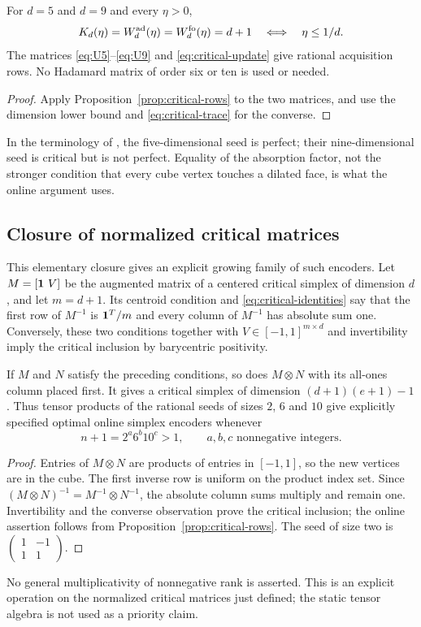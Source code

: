 \begin{corollary}
\label{cor:nonhadamard}
For $d=5$ and $d=9$ and every $\eta>0$,
\[
 K_d(\eta)=W_d^{\rm ad}(\eta)=W_d^{\rm fo}(\eta)=d+1
                  \quad\Longleftrightarrow\quad\eta\le1/d.
\]
The matrices \eqref{eq:U5}--\eqref{eq:U9} and
\eqref{eq:critical-update} give rational acquisition rows. No Hadamard
matrix of order six or ten is used or needed.
\end{corollary}
\begin{proof}
Apply Proposition~\ref{prop:critical-rows} to the two matrices, and use
the dimension lower bound and \eqref{eq:critical-trace} for the converse.
\end{proof}
In the terminology of \cite{NU}, the five-dimensional seed is perfect;
their nine-dimensional seed is critical but is not perfect. Equality
of the absorption factor, not the stronger condition that every cube
vertex touches a dilated face, is what the online argument uses.

\subsection{Closure of normalized critical matrices}
This elementary closure gives an explicit growing family of such
encoders. Let $M=[\mathbf1\ V]$ be the augmented matrix of a centered critical
simplex of dimension $d$, and let $m=d+1$. Its centroid condition and
\eqref{eq:critical-identities} say that the first row of $M^{-1}$ is
$\mathbf1^T/m$ and every column of $M^{-1}$ has absolute sum one. Conversely,
these two conditions together with $V\in[-1,1]^{m\times d}$ and
invertibility imply the critical inclusion by barycentric positivity.

\begin{proposition}
\label{prop:critical-tensor}
If $M$ and $N$ satisfy the preceding conditions, so does $M\otimes N$
with its all-ones column placed first. It gives a critical simplex of
dimension $(d+1)(e+1)-1$. Thus tensor products of the rational seeds
of sizes $2$, $6$ and $10$ give explicitly specified optimal online
simplex encoders whenever
\[
       n+1=2^a6^b10^c>1,\qquad a,b,c\text{ nonnegative integers}.
\]
\end{proposition}
\begin{proof}
Entries of $M\otimes N$ are products of entries in $[-1,1]$, so the
new vertices are in the cube. The first inverse row is uniform on the
product index set. Since $(M\otimes N)^{-1}=M^{-1}\otimes N^{-1}$,
the absolute column sums multiply and remain one. Invertibility and
the converse observation prove the critical inclusion; the online
assertion follows from Proposition~\ref{prop:critical-rows}. The seed
of size two is $\left(\begin{smallmatrix}1&-1\\1&1\end{smallmatrix}\right)$.
\end{proof}
No general multiplicativity of nonnegative rank is asserted. This is
an explicit operation on the normalized critical matrices just defined;
the static tensor algebra is not used as a priority claim.
